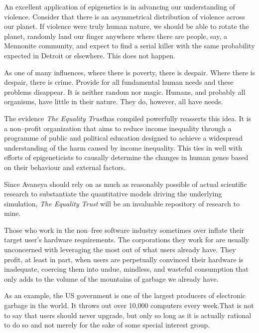 An excellent application of epigenetics is in advancing our understanding of violence. Consider that there is an asymmetrical distribution of violence across our planet. If violence were truly human nature, we should be able to rotate the planet, randomly land our finger anywhere where there are people, say, a Mennonite community, and expect to find a serial killer with the same  probability expected in Detroit or elsewhere. This does not happen.

As one of many influences, where there is poverty, there is despair. Where there is despair, there is crime. Provide for all fundamental human needs and these problems disappear. It is neither random nor magic. Humans, and probably all organisms, have little in their nature. They do, however, all have needs.

The evidence {\it The Equality Trust} has compiled powerfully reasserts this idea. It is a non--profit organization that aims to reduce income inequality through a programme of public and political education designed to achieve a widespread understanding of the harm caused by income inequality. This ties in well with efforts of epigeneticists to causally determine the changes in human genes based on their behaviour and external factors.

Since Avaneya should rely on as much as reasonably possible of actual scientific research to substantiate the quantitative models driving the underlying simulation, {\it The Equality Trust} will be an invaluable repository of research to mine.

Those who work in the non--free software industry sometimes over inflate their target user's hardware requirements. The corporations they work for are usually unconcerned with leveraging the most out of what users already have. They profit, at least in part, when users are perpetually convinced their hardware is inadequate, coercing them into undue, mindless, and wasteful consumption that only adds to the volume of the mountains of garbage we already have.\footnotecite[caroll2008] 

As an example, the US government is one of the largest producers of electronic garbage in the world. It throws out over 10,000 computers every week.\footnotecite[urbina2013] That is not to say that users should never upgrade, but only so long as it is actually rational to do so and not merely for the sake of some special interest group.
    {}

